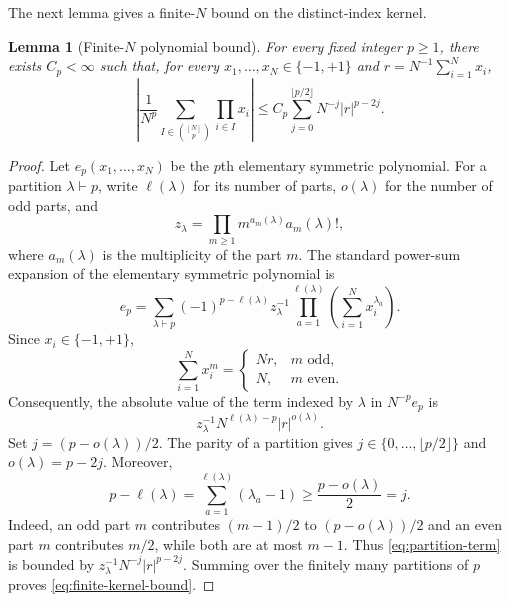\documentclass[letterpaper,11pt,reqno]{amsart}
\newtheorem{lem}[thm]{Lemma}
\renewcommand{\leq}{\leqslant}
\renewcommand{\geq}{\geqslant}
\begin{document}
The next lemma gives a finite-$N$ bound on the distinct-index kernel.

\begin{lem}[Finite-$N$ polynomial bound]
\label{lem:finite-kernel-bound}
For every fixed integer $p\geq1$, there exists $C_p<\infty$ such that,
for every $x_1,\ldots,x_N\in\{-1,+1\}$ and
$r=N^{-1}\sum_{i=1}^N x_i$,
\begin{equation}
\left|
\frac1{N^p}
\sum_{I\in\binom{[N]}p}\prod_{i\in I}x_i
\right|
\leq
C_p
\sum_{j=0}^{\lfloor p/2\rfloor}
N^{-j}|r|^{p-2j}.
\label{eq:finite-kernel-bound}
\end{equation}
\end{lem}

\begin{proof}
Let $e_p(x_1,\ldots,x_N)$ be the $p$th elementary symmetric
polynomial. For a partition $\lambda\vdash p$, write
$\ell(\lambda)$ for its number of parts, $o(\lambda)$ for the number of
odd parts, and
\[
z_\lambda
=
\prod_{m\geq1}m^{a_m(\lambda)}a_m(\lambda)!,
\]
where $a_m(\lambda)$ is the multiplicity of the part $m$. The standard
power-sum expansion of the elementary symmetric polynomial is
\begin{equation}
e_p
=
\sum_{\lambda\vdash p}
(-1)^{p-\ell(\lambda)}z_\lambda^{-1}
\prod_{a=1}^{\ell(\lambda)}
\left(\sum_{i=1}^N x_i^{\lambda_a}\right).
\label{eq:elementary-power-sum}
\end{equation}
Since $x_i\in\{-1,+1\}$,
\[
\sum_{i=1}^N x_i^m
=
\begin{cases}
Nr,&m\text{ odd},\\
N,&m\text{ even}.
\end{cases}
\]
Consequently, the absolute value of the term indexed by $\lambda$ in
$N^{-p}e_p$ is
\begin{equation}
z_\lambda^{-1}
N^{\ell(\lambda)-p}|r|^{o(\lambda)}.
\label{eq:partition-term}
\end{equation}
Set $j=(p-o(\lambda))/2$. The parity of a partition gives
$j\in\{0,\ldots,\lfloor p/2\rfloor\}$ and
$o(\lambda)=p-2j$. Moreover,
\begin{equation}
p-\ell(\lambda)
=
\sum_{a=1}^{\ell(\lambda)}(\lambda_a-1)
\geq
\frac{p-o(\lambda)}2
=j.
\label{eq:partition-count}
\end{equation}
Indeed, an odd part $m$ contributes $(m-1)/2$ to
$(p-o(\lambda))/2$ and an even part $m$ contributes $m/2$, while both
are at most $m-1$. Thus \eqref{eq:partition-term} is bounded by
$z_\lambda^{-1}N^{-j}|r|^{p-2j}$. Summing over the finitely many
partitions of $p$ proves \eqref{eq:finite-kernel-bound}.
\end{proof}
\end{document}
